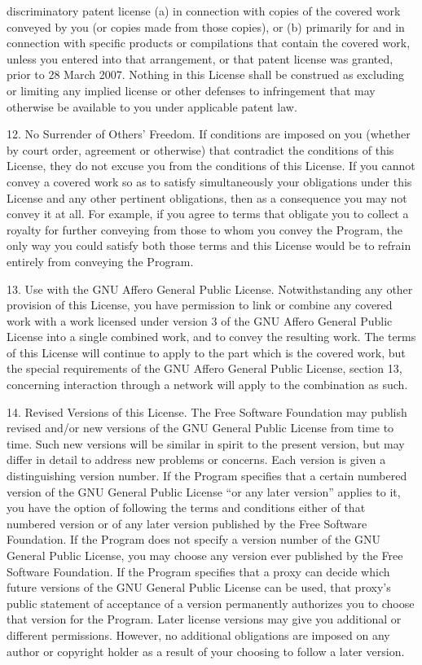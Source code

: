 \documentclass {scrbook}
\begin{document}
\begin{tiny}
discriminatory patent license (a) in connection with copies of the covered work conveyed by you (or copies made from those copies), or (b) primarily for and in connection with specific products or compilations that contain the covered work, unless you entered into that arrangement, or that patent license was granted, prior to 28 March 2007. Nothing in this License shall be construed as excluding or limiting any implied license or other defenses to infringement that may otherwise be available to you under applicable patent law.

12. No Surrender of Others' Freedom. If conditions are imposed on you (whether by court order, agreement or otherwise) that contradict the conditions of this License, they do not excuse you from the conditions of this License. If you cannot convey a covered work so as to satisfy simultaneously your obligations under this License and any other pertinent obligations, then as a consequence you may not convey it at all. For example, if you agree to terms that obligate you to collect a royalty for further conveying from those to whom you convey the Program, the only way you could satisfy both those terms and this License would be to refrain entirely from conveying the Program.

13. Use with the GNU Affero General Public License. Notwithstanding any other provision of this License, you have permission to link or combine any covered work with a work licensed under version 3 of the GNU Affero General Public License into a single combined work, and to convey the resulting work. The terms of this License will continue to apply to the part which is the covered work, but the special requirements of the GNU Affero General Public License, section 13, concerning interaction through a network will apply to the combination as such.

14. Revised Versions of this License. The Free Software Foundation may publish revised and/or new versions of the GNU General Public License from time to time. Such new versions will be similar in spirit to the present version, but may differ in detail to address new problems or concerns. Each version is given a distinguishing version number. If the Program specifies that a certain numbered version of the GNU General Public License ``or any later version'' applies to it, you have the option of following the terms and conditions either of that numbered version or of any later version published by the Free Software Foundation. If the Program does not specify a version number of the GNU General Public License, you may choose any version ever published by the Free Software Foundation. If the Program specifies that a proxy can decide which future versions of the GNU General Public License can be used, that proxy's public statement of acceptance of a version permanently authorizes you to choose that version for the Program. Later license versions may give you additional or different permissions. However, no additional obligations are imposed on any author or copyright holder as a result of your choosing to follow a later version.


\end{tiny}
\end{document}

